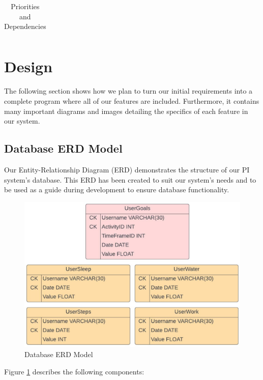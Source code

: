 \documentclass[11pt]{article}
\begin{document}
\begin{table}[!ht]
\begin{center}
\begin{tabular}{|l|c|c|c|}
\end{tabular}
\caption{Priorities and Dependencies}
\label{tab:reqTable}
\end{center}
\end{table}


\section{Design}

The following section shows how we plan to turn our initial requirements 
into a complete program where all of our features are included. Furthermore, 
it contains many important diagrams and images detailing the specifics of each 
feature in our system.\par

\subsection{Database ERD Model}

Our Entity-Relationship Diagram (ERD) demonstrates the structure of 
our PI system's database. This ERD has been created
to suit our system's needs and to be used as a guide during development
to ensure database functionality.\par

\begin{figure}[!ht]
  \centering
  \includegraphics[width = 0.7\linewidth]{PI Systems Database}
  \caption{Database ERD Model}
  \label{fig:PI_ERD}
\end{figure}

\newpage

Figure \ref{fig:PI_ERD} describes the following components:
\end{document}

